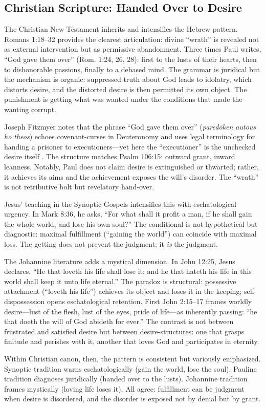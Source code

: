 \subsection*{Christian Scripture: Handed Over to Desire}
\label{ssec:iii-christian-scripture}

The Christian New Testament inherits and intensifies the Hebrew pattern. Romans 1:18--32
provides
the clearest articulation: divine ``wrath'' is revealed not as external intervention but as
permissive abandonment. Three times Paul writes, ``God gave them over'' (Rom. 1:24, 26, 28):
first to the lusts of their hearts, then to dishonorable passions, finally to a debased mind.
The grammar is juridical but the mechanism is organic: suppressed truth about God leads to
idolatry, which distorts desire, and the distorted desire is then permitted its own object.
The punishment is getting what was wanted under the conditions that made the wanting corrupt.

Joseph Fitzmyer notes that the phrase ``God gave them over'' (\emph{paredōken autous ho theos})
echoes covenant-curses in Deuteronomy and uses legal terminology for handing a prisoner to
executioners---yet here the ``executioner'' is the unchecked desire itself
\parencite[p.~280]{FitzmyerRomans1993}. The structure matches Psalm 106:15: outward grant,
inward leanness. Notably, Paul does not claim desire is extinguished or thwarted; rather, it
achieves its aims and the achievement exposes the will's disorder. The ``wrath'' is not
retributive bolt but revelatory hand-over.

Jesus' teaching in the Synoptic Gospels intensifies this with eschatological urgency. In Mark
8:36, he asks, ``For what shall it profit a man, if he shall gain the whole world, and lose
his own soul?'' The conditional is not hypothetical but diagnostic: maximal fulfillment
(``gaining the world'') can coincide with maximal loss. The getting does not prevent the
judgment; it \emph{is} the judgment.

The Johannine literature adds a mystical dimension. In John 12:25, Jesus declares, ``He that
loveth his life shall lose it; and he that hateth his life in this world shall keep it unto
life eternal.'' The paradox is structural: possessive attachment (``loveth his life'')
achieves its object and loses it in the keeping; self-dispossession opens eschatological
retention. First John 2:15--17 frames worldly desire---lust of the flesh, lust of the eyes,
pride of life---as inherently passing: ``he that doeth the will of God abideth for ever.''
The contrast is not between frustrated and satisfied desire but between desire-structures:
one that grasps
finitude and perishes with it, another that loves God and participates in eternity.

Within Christian canon, then, the pattern is consistent but variously emphasized. Synoptic
tradition warns eschatologically (gain the world, lose the soul). Pauline tradition diagnoses
juridically (handed over to the lusts). Johannine tradition frames mystically (loving life
loses it). All agree: fulfillment can be judgment when desire is disordered, and the disorder
is exposed not by denial but by grant.
